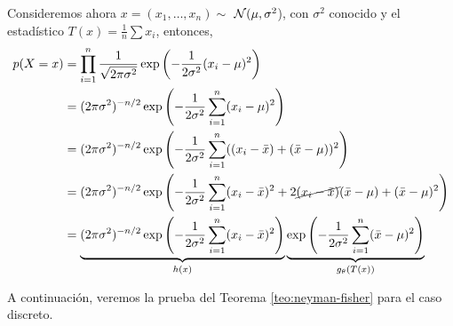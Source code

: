 \begin{example}
	Consideremos ahora $x=(x_1,\ldots, x_n)\sim$ ${\mathcal N}(\mu,\sigma^2$), con $\sigma^2$ conocido y el estadístico $T(x) = \frac{1}{n}\sum x_i$, entonces, 
	\begin{align*}
		p(X=x) & = \prod_{i=1}^n \frac{1}{\sqrt{2\pi\sigma^2}}\exp\left(-\frac{1}{2\sigma^2}(x_i-\mu)^2\right)\\
		&=  (2\pi\sigma^2)^{-n/2}\exp\left(-\frac{1}{2\sigma^2}\sum_{i=1}^n(x_i-\mu)^2\right)\\
		&=  (2\pi\sigma^2)^{-n/2}\exp\left(-\frac{1}{2\sigma^2}\sum_{i=1}^n((x_i-\bar{x}) + (\bar{x}-\mu))^2\right)\\
		&=  (2\pi\sigma^2)^{-n/2}\exp\left(-\frac{1}{2\sigma^2}\sum_{i=1}^n (x_i-\bar{x})^2 + 2\cancel{(x_i-\bar{x})}(\bar{x}-\mu) + (\bar{x}-\mu)^2\right)\\
		&=  \underbrace{(2\pi\sigma^2)^{-n/2}\exp\left(-\frac{1}{2\sigma^2}\sum_{i=1}^n (x_i-\bar{x})^2\right)}_{h(x)} \underbrace{\exp\left( -\frac{1}{2\sigma^2}\sum_{i=1}^n (\bar{x}-\mu)^2\right)}_{g_\theta(T(x))}
	\end{align*}
\end{example}

A continuación, veremos la prueba del Teorema \ref{teo:neyman-fisher} para el caso discreto. 


